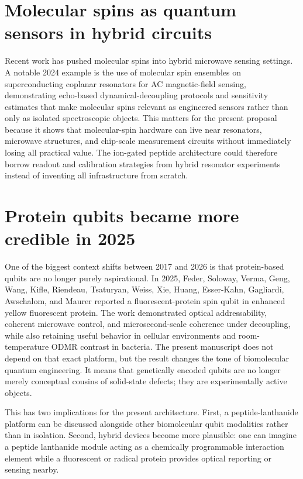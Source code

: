 \documentclass[11pt]{report}
\theoremstyle{definition}
\begin{document}
\section{Molecular spins as quantum sensors in hybrid circuits}
Recent work has pushed molecular spins into hybrid microwave sensing settings. A notable 2024 example is the use of molecular spin ensembles on superconducting coplanar resonators for AC magnetic-field sensing, demonstrating echo-based dynamical-decoupling protocols and sensitivity estimates that make molecular spins relevant as engineered sensors rather than only as isolated spectroscopic objects. This matters for the present proposal because it shows that molecular-spin hardware can live near resonators, microwave structures, and chip-scale measurement circuits without immediately losing all practical value. The ion-gated peptide architecture could therefore borrow readout and calibration strategies from hybrid resonator experiments instead of inventing all infrastructure from scratch.

\section{Protein qubits became more credible in 2025}
One of the biggest context shifts between 2017 and 2026 is that protein-based qubits are no longer purely aspirational. In 2025, Feder, Soloway, Verma, Geng, Wang, Kifle, Riendeau, Tsaturyan, Weiss, Xie, Huang, Esser-Kahn, Gagliardi, Awschalom, and Maurer reported a fluorescent-protein spin qubit in enhanced yellow fluorescent protein. The work demonstrated optical addressability, coherent microwave control, and microsecond-scale coherence under decoupling, while also retaining useful behavior in cellular environments and room-temperature ODMR contrast in bacteria. The present manuscript does not depend on that exact platform, but the result changes the tone of biomolecular quantum engineering. It means that genetically encoded qubits are no longer merely conceptual cousins of solid-state defects; they are experimentally active objects.

This has two implications for the present architecture. First, a peptide-lanthanide platform can be discussed alongside other biomolecular qubit modalities rather than in isolation. Second, hybrid devices become more plausible: one can imagine a peptide lanthanide module acting as a chemically programmable interaction element while a fluorescent or radical protein provides optical reporting or sensing nearby.
\end{document}

